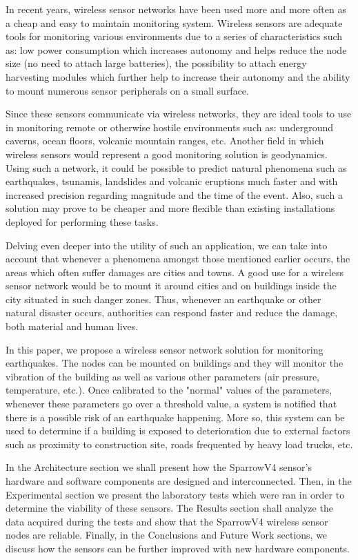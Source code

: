 In recent years, wireless sensor networks have been used more and more often as a cheap and easy to maintain monitoring system.
Wireless sensors are adequate tools for monitoring various environments due to a series of characteristics such as: low power 
consumption which increases autonomy and helps reduce the node size (no need to attach large batteries), the possibility to 
attach energy harvesting modules which further help to increase their autonomy and the ability to mount numerous sensor peripherals 
on a small surface.

Since these sensors communicate via wireless networks, they are ideal tools to use in monitoring remote or otherwise hostile 
environments such as: underground caverns, ocean floors, volcanic mountain ranges, etc. Another field in which wireless sensors 
would represent a good monitoring solution is geodynamics. Using such a network, it could be
possible to predict natural phenomena such 
as earthquakes, tsunamis, landslides and volcanic eruptions much faster and with increased precision regarding magnitude and the 
time of the event. Also, such a solution may prove to be cheaper and more flexible than existing installations deployed for performing 
these tasks.

Delving even deeper into the utility of such an application, we can take into account that whenever a phenomena amongst those mentioned 
earlier occurs, the areas which often suffer damages are cities and towns. A good use for a wireless sensor network would be to mount it 
around cities and on buildings inside the city situated in such danger zones. Thus, whenever an earthquake or other natural disaster occurs, 
authorities can respond faster and reduce the damage, both material and human lives.

In this paper, we propose a wireless sensor network solution for monitoring earthquakes. The nodes can be mounted on buildings and 
they will monitor the vibration of the building as well as various other parameters (air pressure, temperature, etc.). Once calibrated 
to the "normal" values of the parameters, whenever these parameters go over a threshold value, a system is notified that there is a possible 
risk of an earthquake happening. More so, this system can be used to determine if a building is
exposed to deterioration due to external factors such as proximity 
to construction site, roads frequented by heavy load trucks, etc.

In the Architecture section we shall present how the SparrowV4 sensor's hardware and software components are designed and interconnected.
Then, in the Experimental section we present the laboratory tests which were ran in order to determine the viability of these sensors.
The Results section shall analyze the data acquired during the tests and show that the SparrowV4 wireless sensor nodes are reliable. Finally, 
in the Conclusions and Future Work sections, we discuss how the sensors can be further improved with new hardware components.
